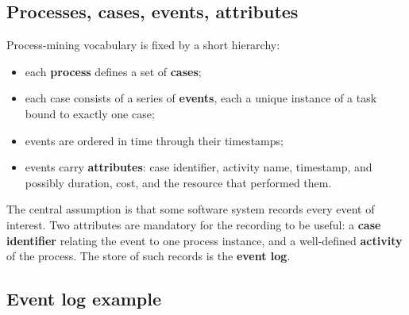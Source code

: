 \subsection{Processes, cases, events, attributes}

Process-mining vocabulary is fixed by a short hierarchy:
\begin{itemize}
  \item each \textbf{process} defines a set of \textbf{cases};
  \item each case consists of a series of \textbf{events}, each a unique instance of a task bound to exactly one case;
  \item events are ordered in time through their timestamps;
  \item events carry \textbf{attributes}: case identifier, activity name, timestamp, and possibly duration, cost, and the resource that performed them.
\end{itemize}
The central assumption is that some software system records every event of interest. Two attributes are mandatory for the recording to be useful: a \textbf{case identifier} relating the event to one process instance, and a well-defined \textbf{activity} of the process. The store of such records is the \textbf{event log}.

\subsection{Event log example}

